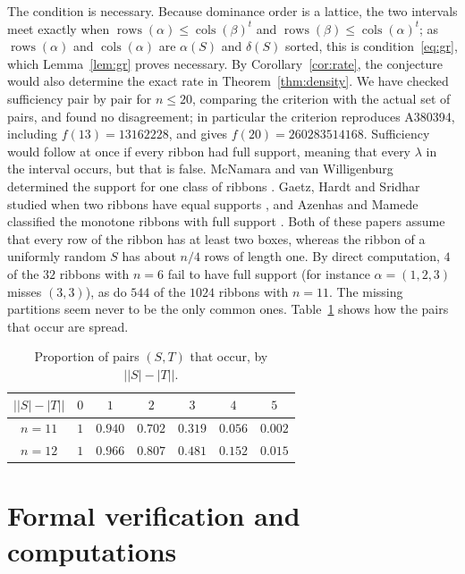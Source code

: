 \documentclass[12pt]{article}
\numberwithin{theorem}{section}
\numberwithin{equation}{section}
\DeclareMathOperator{\rows}{rows}
\DeclareMathOperator{\cols}{cols}
\begin{document}
The condition is necessary. Because dominance order is a lattice, the two intervals meet exactly when
$\rows(\alpha)\le\cols(\beta)^t$ and $\rows(\beta)\le\cols(\alpha)^t$; as $\rows(\alpha)$ and $\cols(\alpha)$ are
$\alpha(S)$ and $\delta(S)$ sorted, this is condition~\eqref{eq:gr}, which Lemma~\ref{lem:gr} proves necessary.
By Corollary~\ref{cor:rate}, the conjecture would also determine the exact rate in Theorem~\ref{thm:density}. We have checked sufficiency pair by
pair for $n\le20$, comparing the criterion with the actual set of pairs, and found no disagreement; in
particular the criterion reproduces A380394, including $f(13)=13162228$, and gives $f(20)=260283514168$. Sufficiency would follow at once if every ribbon had full
support, meaning that every $\lambda$ in the interval occurs, but that is false. McNamara and van Willigenburg
determined the support for one class of ribbons \cite{mvw2012}. Gaetz, Hardt and Sridhar studied when two
ribbons have equal supports \cite{gaetz}, and Azenhas and Mamede classified the monotone ribbons with full
support \cite{azenhas}. Both of these papers assume that every row of the ribbon has at least two boxes,
whereas the ribbon of a uniformly random $S$ has about $n/4$ rows of length one. By direct computation, $4$ of
the $32$ ribbons with $n=6$ fail to have full support (for instance $\alpha=(1,2,3)$ misses $(3,3)$), as do
$544$ of the $1024$ ribbons with $n=11$. The missing partitions seem never to be the only common ones.
Table~\ref{tab:split} shows how the pairs that occur are spread.

\begin{table}[ht]
\centering
\begin{tabular}{ccccccc}
\toprule
$\bigl||S|-|T|\bigr|$ & $0$ & $1$ & $2$ & $3$ & $4$ & $5$\\
\midrule
$n=11$ & $1$ & $0.940$ & $0.702$ & $0.319$ & $0.056$ & $0.002$\\
$n=12$ & $1$ & $0.966$ & $0.807$ & $0.481$ & $0.152$ & $0.015$\\
\bottomrule
\end{tabular}
\caption{Proportion of pairs $(S,T)$ that occur, by $\bigl||S|-|T|\bigr|$.}
\label{tab:split}
\end{table}

\section{Formal verification and computations}\label{sec:verification}
\end{document}
